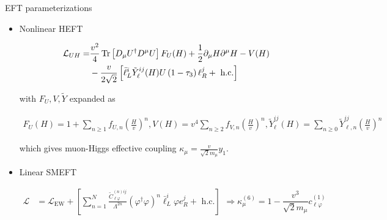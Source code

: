 \documentclass[aspectratio=169]{beamer}
\begin{document}
\begin{frame}{EFT parameterizations}
	\begin{itemize}
	\item Nonlinear HEFT 
	\begin{small}
	\begin{equation*}
	\begin{aligned}
	\mathcal{L}_{U H}=&\frac{v^{2}}{4} \Tr\left[D_{\mu} U^{\dagger} D^{\mu} U\right] F_{U}(H)
	+\frac{1}{2} \partial_{\mu} H \partial^{\mu} H-V(H) \\
	&-\frac{v}{2 \sqrt{2}}\left[\bar{\ell}_{L}^{i} \tilde{Y}_{\ell}^{i j}(H) U\left(1-\tau_{3}\right) \ell_{R}^{j}+\textrm{ h.c.}\right]
	\end{aligned}
	\end{equation*}
	\end{small}
	with $F_U,V,\tilde{Y}$ expanded as
	\begin{small}
	\begin{equation*}\begin{aligned}
	F_{U}(H)=1+\sum_{n \geq 1} f_{U, n}\left(\frac{H}{v}\right)^{n},
	V(H)=v^{4} \sum_{n \geq 2} f_{V, n}\left(\frac{H}{v}\right)^{n},
	\tilde{Y}_{\ell}^{i j}(H)=\sum_{n \geq 0} \tilde{Y}_{\ell, n}^{i j}\left(\frac{H}{v}\right)^{n}
	\end{aligned}
	\end{equation*}
	\end{small}
	which gives muon-Higgs effective coupling $\kappa_\mu=\frac{v}{\sqrt{2}m_\mu}y_1$.
	\item Linear SMEFT 
	\begin{small}
	\begin{equation*}
	\begin{aligned}
	\mathcal{L}&=\mathcal{L}_{\mathrm{EW}}
	+\left[\sum_{n=1}^{N} \frac{\tilde{C}_{\ell \varphi}^{(n) i j}}{\Lambda^{2 n}}\left(\varphi^{\dagger} \varphi\right)^{n} \bar{\ell}_{L}^{i} \varphi e^{j}_R+\textrm{ h.c.}\right]
	\end{aligned}
	\Rightarrow \kappa_{\mu}^{(6)}=1-\frac{v^{3}}{\sqrt{2} m_{\mu}} c_{\ell \varphi}^{(1)}
	\end{equation*}
	\end{small}
	\end{itemize}
\end{frame}
\end{document}
